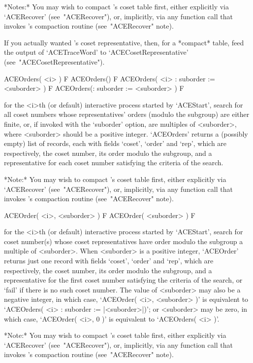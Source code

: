 *Notes:*
You may wish to compact {\ACE}'s coset table first, either  explicitly
via `ACERecover' (see~"ACERecover"), or, implicitly, via any  function
call that invokes {\ACE}'s compaction routine (see~"ACERecover" note).

If you actually wanted {\ACE}'s  coset  representative,  then,  for  a
*compact*   table,   feed   the   output    of    `ACETraceWord'    to
`ACECosetRepresentative' (see~"ACECosetRepresentative").

\>ACEOrders( <i> ) F
\>ACEOrders() F
\>ACEOrders( <i> : suborder := <suborder> ) F
\>ACEOrders(: suborder := <suborder> ) F

for the <i>th (or  default)  interactive  {\ACE}  process  started  by
`ACEStart', search for all coset numbers whose representatives' orders
(modulo the subgroup) are either  finite,  or,  if  invoked  with  the
`suborder' option,  are  multiples  of  <suborder>,  where  <suborder>
should be a positive integer. `ACEOrders' returns a  (possibly  empty)
list of records, each with fields `coset', `order'  and  `rep',  which
are respectively, the coset number, its order modulo the subgroup, and
a representative for each coset number satisfying the criteria of  the
search.

*Note:*
You may wish to compact {\ACE}'s coset table first, either  explicitly
via `ACERecover' (see~"ACERecover"), or, implicitly, via any  function
call that invokes {\ACE}'s compaction routine (see~"ACERecover" note).

\>ACEOrder( <i>, <suborder> ) F
\>ACEOrder( <suborder> ) F

for the <i>th (or  default)  interactive  {\ACE}  process  started  by
`ACEStart', search for coset  number(s)  whose  coset  representatives
have  order  modulo  the  subgroup  a  multiple  of  <suborder>.  When
<suborder> is a positive integer, `ACEOrder' returns just  one  record
with fields `coset', `order' and `rep', which  are  respectively,  the
coset number, its order modulo the subgroup, and a representative  for
the first coset number satisfying  the  criteria  of  the  search,  or
`fail' if there is no such coset number. The value of  <suborder>  may
also be a negative integer, in which case, `ACEOrder( <i>,  <suborder>
)' is equivalent to `ACEOrders( <i> : suborder :=  |<suborder>|)';  or
<suborder> may be zero,  in  which  case,  `ACEOrder(  <i>,  0  )'  is
equivalent to `ACEOrders( <i> )'.

*Note:*
You may wish to compact {\ACE}'s coset table first, either  explicitly
via `ACERecover' (see~"ACERecover"), or, implicitly, via any  function
call that invokes {\ACE}'s compaction routine (see~"ACERecover" note).

